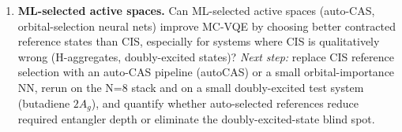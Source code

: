 \begin{enumerate}
  \item \textbf{ML-selected active spaces.} Can ML-selected active spaces
        (auto-CAS, orbital-selection neural nets) improve MC-VQE by choosing
        better contracted reference states than CIS, especially for systems
        where CIS is qualitatively wrong (H-aggregates, doubly-excited
        states)? \emph{Next step:} replace CIS reference selection with an
        auto-CAS pipeline (autoCAS) or a small orbital-importance NN, rerun
        on the N=8 stack and on a small doubly-excited test system
        (butadiene $2A_g$), and quantify whether auto-selected references
        reduce required entangler depth or eliminate the doubly-excited-state
        blind spot.
\end{enumerate}
